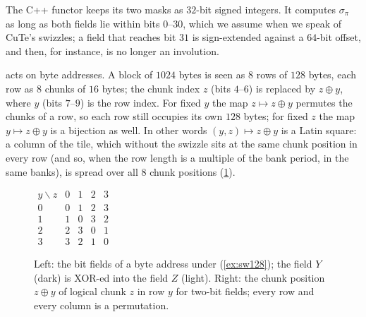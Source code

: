 \noindent The C++ functor keeps its two masks as $32$-bit signed integers. It computes $\sigma_\pi$
as long as both fields lie within bits $0$--$30$, which we assume when we speak of CuTe's swizzles;
a field that reaches bit $31$ is sign-extended against a $64$-bit offset, and then, for instance,
 is no longer an involution.

\begin{example}\label{ex:sw128}
 acts on byte addresses. A block of $1024$ bytes is seen as $8$ rows of
$128$ bytes, each row as $8$ chunks of $16$ bytes; the chunk index $z$ (bits $4$--$6$) is replaced
by $z\oplus y$, where $y$ (bits $7$--$9$) is the row index. For fixed $y$ the map $z\mapsto z\oplus y$
permutes the chunks of a row, so each row still occupies its own $128$ bytes; for fixed $z$ the map
$y\mapsto z\oplus y$ is a bijection as well. In other words $(y,z)\mapsto z\oplus y$ is a Latin
square: a column of the tile, which without the swizzle sits at the same chunk position in every
row (and so, when the row length is a multiple of the bank period, in the same banks), is spread
over all $8$ chunk positions (\cref{fig:swizzle}).
\end{example}

\begin{figure}[t]\centering
{}
\qquad\qquad
$\begin{array}{c|cccc}
 y\backslash z&0&1&2&3\\\hline
 0&0&1&2&3\\ 1&1&0&3&2\\ 2&2&3&0&1\\ 3&3&2&1&0
\end{array}$
\caption{Left: the bit fields of a byte address under  (\cref{ex:sw128}); the
field $Y$ (dark) is XOR-ed into the field $Z$ (light). Right: the chunk position $z\oplus y$ of
logical chunk $z$ in row $y$ for two-bit fields; every row and every column is a permutation.}
\label{fig:swizzle}
\end{figure}

